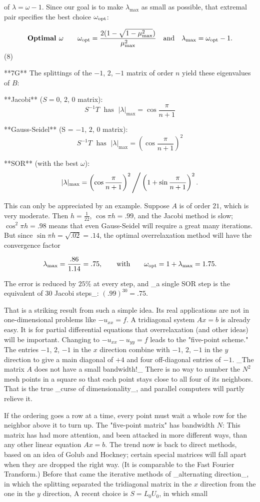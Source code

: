 of \(\lambda=\omega-1\). Since our goal is to make \(\lambda_{\max}\) as small as possible, that extremal pair specifies the best choice \(\omega_{\rm opt}\):

\[\mbox{\bf Optimal $\omega$}\qquad\omega_{\rm opt}=\frac{2(1-\sqrt{1-\mu_{\max}^{ 2}})}{\mu_{\max}^{2}}\quad\mbox{and}\quad\lambda_{\max}=\omega_{\rm opt}-1.\] (8)

**7G** The splittings of the \(-1\), \(2\), \(-1\) matrix of order \(n\) yield these eigenvalues of \(B\):

**Jacobi** (\(S=0\), \(2\), \(0\) matrix): \[S^{-1}T\;\mbox{ has }\;|\lambda|_{\max}=\cos\frac{\pi}{n+1}\]

**Gauss-Seidel** (S = \(-1\), \(2\), \(0\) matrix): \[S^{-1}T\;\mbox{ has }\;|\lambda|_{\max}=\left(\cos\frac{\pi}{n+1}\right)^{2}\]

**SOR** (with the best \(\omega\)): \[|\lambda|_{\max}=\left(\cos\frac{\pi}{n+1}\right)^{2}\Bigg{/}\left(1+\sin \frac{\pi}{n+1}\right)^{2}.\]

This can only be appreciated by an example. Suppose \(A\) is of order \(21\), which is very moderate. Then \(h=\frac{1}{22}\), \(\cos\pi h=.99\), and the Jacobi method is slow; \(\cos^{2}\pi h=.98\) means that even Gauss-Seidel will require a great many iterations. But since \(\sin\pi h=\sqrt{.02}=.14\), the optimal overrelaxation method will have the convergence factor

\[\lambda_{\max}=\frac{.86}{1.14}=.75,\qquad\mbox{with}\qquad\omega_{\rm opt}=1 +\lambda_{\max}=1.75.\]

The error is reduced by \(25\%\) at every step, and _a single SOR step is the equivalent of 30 Jacobi steps_: \((.99)^{30}=.75\).

That is a striking result from such a simple idea. Its real applications are not in one-dimensional problems like \(-u_{xx}=f\). A tridiagonal system \(Ax=b\) is already easy. It is for partial differential equations that overrelaxation (and other ideas) will be important. Changing to \(-u_{xx}-u_{yy}=f\) leads to the "five-point scheme." The entries \(-1\), \(2\), \(-1\) in the \(x\) direction combine with \(-1\), \(2\), \(-1\) in the \(y\) direction to give a main diagonal of \(+4\) and four off-diagonal entries of \(-1\). _The matrix \(A\) does not have a small bandwidth!_ There is no way to number the \(N^{2}\) mesh points in a square so that each point stays close to all four of its neighbors. That is the true _curse of dimensionality_, and parallel computers will partly relieve it.

If the ordering goes a row at a time, every point must wait a whole row for the neighbor above it to turn up. The "five-point matrix" has bandwidth \(N\): This matrix has had more attention, and been attacked in more different ways, than any other linear equation \(Ax=b\). The trend now is back to direct methods, based on an idea of Golub and Hockney; certain special matrices will fall apart when they are dropped the right way. (It is comparable to the Fast Fourier Transform.) Before that came the iterative methods of _alternating direction_, in which the splitting separated the tridiagonal matrix in the \(x\) direction from the one in the \(y\) direction, A recent choice is \(S=L_{0}U_{0}\), in which small 